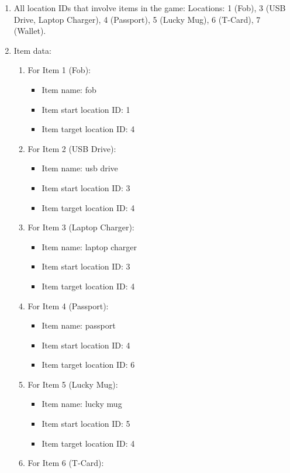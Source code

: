 \documentclass[11pt]{article}
\begin{document}
\begin{enumerate}
\item All location IDs that involve items in the game:
Locations: 1 (Fob), 3 (USB Drive, Laptop Charger), 4 (Passport), 5 (Lucky Mug), 6 (T-Card), 7 (Wallet).

\item Item data:
\begin{enumerate}
    \item For Item 1 (Fob):
    \begin{itemize}
    \item Item name: fob
    \item Item start location ID: 1
    \item Item target location ID: 4
    \end{itemize}
    \item For Item 2 (USB Drive):
    \begin{itemize}
    \item Item name: usb drive
    \item Item start location ID: 3
    \item Item target location ID: 4
    \end{itemize}
    \item For Item 3 (Laptop Charger):
    \begin{itemize}
    \item Item name: laptop charger
    \item Item start location ID: 3
    \item Item target location ID: 4
    \end{itemize}
    \item For Item 4 (Passport):
    \begin{itemize}
    \item Item name: passport
    \item Item start location ID: 4
    \item Item target location ID: 6
    \end{itemize}
    \item For Item 5 (Lucky Mug):
    \begin{itemize}
    \item Item name: lucky mug
    \item Item start location ID: 5
    \item Item target location ID: 4
    \end{itemize}
    \item For Item 6 (T-Card):
    \begin{itemize}

\end{itemize}
\end{enumerate}
\end{enumerate}
\end{document}
